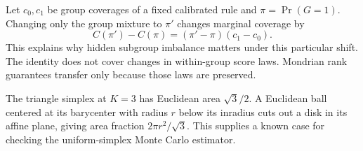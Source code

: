 Let $c_0,c_1$ be group coverages of a fixed calibrated rule and $\pi=\Pr(G=1)$. Changing only the group mixture to $\pi'$ changes marginal coverage by
\begin{equation}
 C(\pi')-C(\pi)=(\pi'-\pi)(c_1-c_0).
 \label{eq:shift}
\end{equation}
This explains why hidden subgroup imbalance matters under this particular shift. The identity does not cover changes in within-group score laws. Mondrian rank guarantees transfer only because those laws are preserved.

The triangle simplex at $K=3$ has Euclidean area $\sqrt{3}/2$. A Euclidean ball centered at its barycenter with radius $r$ below its inradius cuts out a disk in its affine plane, giving area fraction $2\pi r^2/\sqrt{3}$. This supplies a known case for checking the uniform-simplex Monte Carlo estimator.
